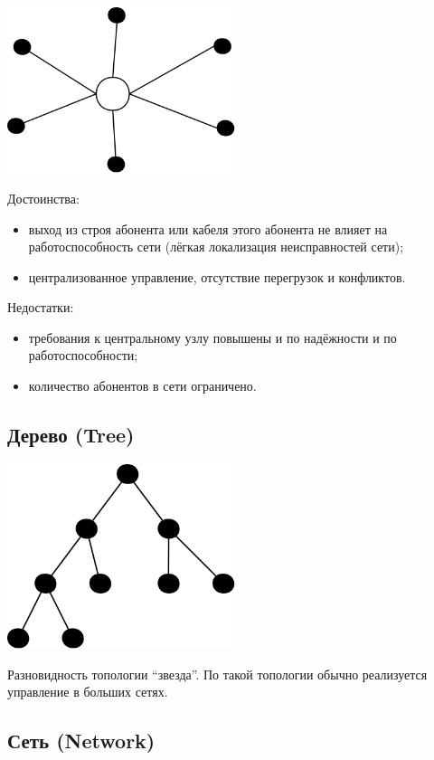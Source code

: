 \documentclass[12pt, russian, oneside, article]{ncc}
\begin{document}
\includegraphics[width=0.5\textwidth]{images/SiSPI/star.png}

Достоинства:
\begin{itemize}
\item выход из строя абонента или кабеля этого абонента не влияет на работоспособность сети (лёгкая локализация неисправностей сети);
\item централизованное управление, отсутствие перегрузок и конфликтов.
\end{itemize}

Недостатки:
\begin{itemize}
\item требования к центральному узлу повышены и по надёжности и по работоспособности;
\item количество абонентов в сети ограничено.
\end{itemize}
\subsection{Дерево (Tree)}
\label{sec-2_4}


\includegraphics[width=0.5\textwidth]{images/SiSPI/tree.png}

Разновидность топологии ``звезда''. По такой топологии обычно реализуется управление в больших сетях.
\subsection{Сеть (Network)}
\label{sec-2_5}
\end{document}
